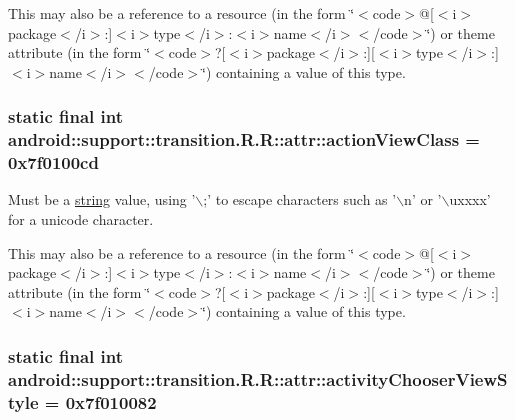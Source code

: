 This may also be a reference to a resource (in the form \char`\"{}$<$code$>$@\mbox{[}$<$i$>$package$<$/i$>$:\mbox{]}$<$i$>$type$<$/i$>$:$<$i$>$name$<$/i$>$$<$/code$>$\char`\"{}) or theme attribute (in the form \char`\"{}$<$code$>$?\mbox{[}$<$i$>$package$<$/i$>$:\mbox{]}\mbox{[}$<$i$>$type$<$/i$>$:\mbox{]}$<$i$>$name$<$/i$>$$<$/code$>$\char`\"{}) containing a value of this type. \hypertarget{classandroid_1_1support_1_1transition_1_1_r_1_1attr_2723950ce51bbc8cffebda0575e67c0b}{
\subsubsection[{actionViewClass}]{\setlength{\rightskip}{0pt plus 5cm}static final int android::support::transition.R.R::attr::actionViewClass = 0x7f0100cd}}
\label{classandroid_1_1support_1_1transition_1_1_r_1_1attr_2723950ce51bbc8cffebda0575e67c0b}


Must be a \hyperlink{classandroid_1_1support_1_1transition_1_1_r_1_1string}{string} value, using '$\backslash$;' to escape characters such as '$\backslash$n' or '$\backslash$uxxxx' for a unicode character. 

This may also be a reference to a resource (in the form \char`\"{}$<$code$>$@\mbox{[}$<$i$>$package$<$/i$>$:\mbox{]}$<$i$>$type$<$/i$>$:$<$i$>$name$<$/i$>$$<$/code$>$\char`\"{}) or theme attribute (in the form \char`\"{}$<$code$>$?\mbox{[}$<$i$>$package$<$/i$>$:\mbox{]}\mbox{[}$<$i$>$type$<$/i$>$:\mbox{]}$<$i$>$name$<$/i$>$$<$/code$>$\char`\"{}) containing a value of this type. \hypertarget{classandroid_1_1support_1_1transition_1_1_r_1_1attr_6e14936ba9ac14adb09c87680b41f96e}{
\subsubsection[{activityChooserViewStyle}]{\setlength{\rightskip}{0pt plus 5cm}static final int android::support::transition.R.R::attr::activityChooserViewStyle = 0x7f010082}}
\label{classandroid_1_1support_1_1transition_1_1_r_1_1attr_6e14936ba9ac14adb09c87680b41f96e}


